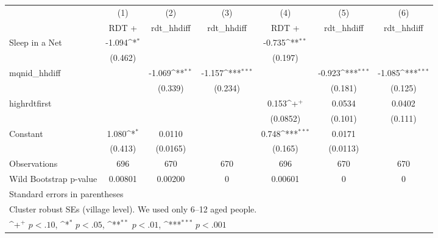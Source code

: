 {
\def\sym#1{\ifmmode^{#1}\else\(^{#1}\)\fi}
\begin{tabular}{l*{6}{c}}
\hline\hline
                    &\multicolumn{1}{c}{(1)}&\multicolumn{1}{c}{(2)}&\multicolumn{1}{c}{(3)}&\multicolumn{1}{c}{(4)}&\multicolumn{1}{c}{(5)}&\multicolumn{1}{c}{(6)}\\
                    &\multicolumn{1}{c}{RDT +}&\multicolumn{1}{c}{rdt\_hhdiff}&\multicolumn{1}{c}{rdt\_hhdiff}&\multicolumn{1}{c}{RDT +}&\multicolumn{1}{c}{rdt\_hhdiff}&\multicolumn{1}{c}{rdt\_hhdiff}\\
\hline
Sleep in a Net      &      -1.094\sym{*}  &                     &                     &      -0.735\sym{**} &                     &                     \\
                    &     (0.462)         &                     &                     &     (0.197)         &                     &                     \\
[1em]
mqnid\_hhdiff        &                     &      -1.069\sym{**} &      -1.157\sym{***}&                     &      -0.923\sym{***}&      -1.085\sym{***}\\
                    &                     &     (0.339)         &     (0.234)         &                     &     (0.181)         &     (0.125)         \\
[1em]
highrdtfirst        &                     &                     &                     &       0.153\sym{+}  &      0.0534         &      0.0402         \\
                    &                     &                     &                     &    (0.0852)         &     (0.101)         &     (0.111)         \\
[1em]
Constant            &       1.080\sym{*}  &      0.0110         &                     &       0.748\sym{***}&      0.0171         &                     \\
                    &     (0.413)         &    (0.0165)         &                     &     (0.165)         &    (0.0113)         &                     \\
\hline
Observations        &         696         &         670         &         670         &         696         &         670         &         670         \\
Wild Bootstrap p-value &     0.00801         &     0.00200         &           0         &     0.00601         &           0         &           0         \\
\hline\hline
\multicolumn{7}{l}{\footnotesize Standard errors in parentheses}\\
\multicolumn{7}{l}{\footnotesize Cluster robust SEs (village level). We used only 6--12 aged people. }\\
\multicolumn{7}{l}{\footnotesize \sym{+} \(p<.10\), \sym{*} \(p<.05\), \sym{**} \(p<.01\), \sym{***} \(p<.001\)}\\
\end{tabular}
}

